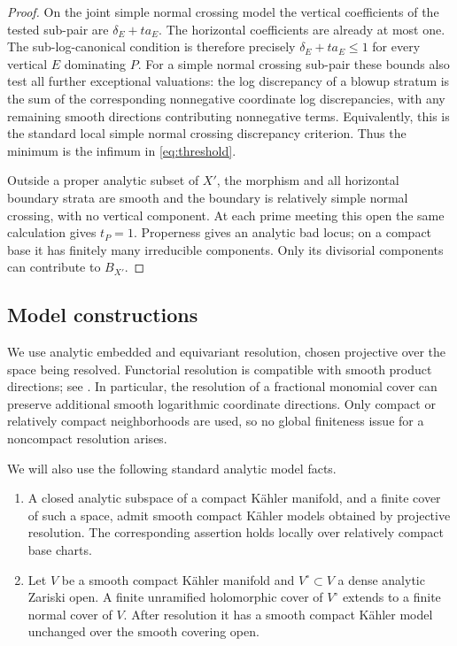\begin{proof}
On the joint simple normal crossing model the vertical coefficients
of the tested sub-pair are \(\delta_E+ta_E\).
The horizontal coefficients are already at most one.
The sub-log-canonical condition is therefore precisely
\(\delta_E+ta_E\leq1\) for every vertical \(E\) dominating \(P\).
For a simple normal crossing sub-pair these bounds also test all
further exceptional valuations: the log discrepancy of a blowup
stratum is the sum of the corresponding nonnegative coordinate log
discrepancies, with any remaining smooth directions contributing
nonnegative terms. Equivalently, this is the standard local
simple normal crossing discrepancy criterion. Thus the minimum is
the infimum in \eqref{eq:threshold}.

Outside a proper analytic subset of \(X'\), the morphism and all
horizontal boundary strata are smooth and the boundary is relatively
simple normal crossing, with no vertical component. At each prime
meeting this open the same calculation gives \(t_P=1\).
Properness gives an analytic bad locus; on a compact base it has
finitely many irreducible components. Only its divisorial components
can contribute to \(B_{X'}\).
\end{proof}

\subsection{Model constructions}

We use analytic embedded and equivariant resolution, chosen projective
over the space being resolved. Functorial resolution is compatible
with smooth product directions; see
\cite[Theorems~1.1 and~1.3]{BM08}.
In particular, the resolution of a fractional monomial cover can
preserve additional smooth logarithmic coordinate directions.
Only compact or relatively compact neighborhoods are used, so no
global finiteness issue for a noncompact resolution arises.

We will also use the following standard analytic model facts.

\begin{lemma}\label{prelim:models}
\begin{enumerate}[label=\textup{(\roman*)}]
\item A closed analytic subspace of a compact K\"ahler manifold,
and a finite cover of such a space, admit smooth compact K\"ahler
models obtained by projective resolution. The corresponding
assertion holds locally over relatively compact base charts.
\item Let \(V\) be a smooth compact K\"ahler manifold and
\(V^\circ\subset V\) a dense analytic Zariski open. A finite
unramified holomorphic cover of \(V^\circ\) extends to a finite
normal cover of \(V\). After resolution it has a smooth compact
K\"ahler model unchanged over the smooth covering open.
\end{enumerate}
\end{lemma}

